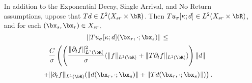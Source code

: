 \begin{prop}
  \label{thm:tl2}
  In addition to the Exponential Decay, Single Arrival, and No Return assumptions, uppose that $ Td \in L^2(X_{sr} \times \bR)$. Then
  $Tu_{\sigma}[\kappa;d]  \in L^2(X_{sr} \times \bR)$, and for each
  $(\bx_s,\bx_r) \in X_{sr}$,
  \[
    \|Tu_{\sigma}[\kappa;d](\bx_r,\cdot;\bx_s)\| \le
  \]
  \[
    \frac{C}{\sigma}\left(\left(
        \frac{\|\partial_t f\|^2_{L^1(\bR)}}{\sigma}(\|f\|_{L^1(\bR)}+\|T\partial_tf\|_{L^1(\bR)})
      \right)\|d\|\right.
  \]
  \begin{equation}
    \label{eqn:tunorm}
    \left.
    + \|\partial_t  f\|_{L^1(\bR)}(\|d (\bx_r,\cdot;\bx_s)\| +\|Td (\bx_r,\cdot;\bx_s)\|)\right).
  \end{equation}
\end{prop}


